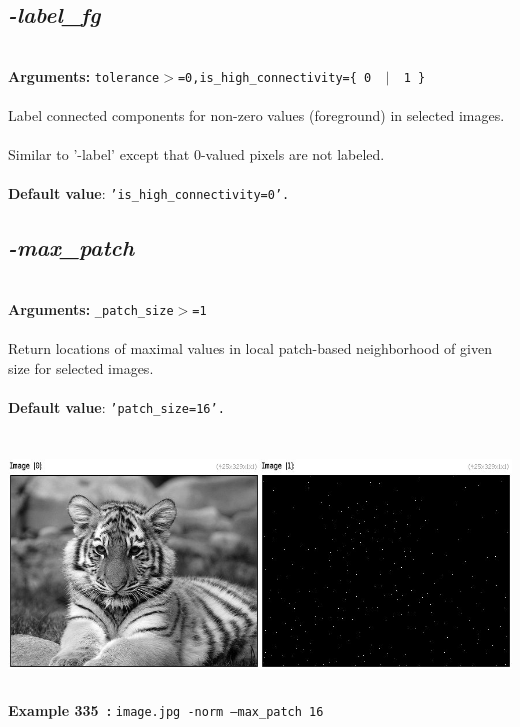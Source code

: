 \documentclass[a4paper,11pt,twoside]{book}
\begin{document}
\subsection{\emph{-label\_fg} }\vspace*{-0.5em}
~\\\textbf{Arguments: } 
{\small \texttt{tolerance$>$=0,is\_high\_connectivity=\{ 0 ~$|$~ 1 \}}}\\~\\
Label connected components for non-zero values (foreground) in selected images.
~\\Similar to '-label' except that 0-valued pixels are not labeled.
~\\~\\\textbf{Default value}: {\small \texttt{'is\_high\_connectivity=0'.}}


\subsection{\emph{-max\_patch} }\vspace*{-0.5em}
~\\\textbf{Arguments: } 
{\small \texttt{\_patch\_size$>$=1}}\\~\\
Return locations of maximal values in local patch-based neighborhood of given size for selected images.
~\\~\\\textbf{Default value}: {\small \texttt{'patch\_size=16'.}}
\begin{center}\includegraphics[keepaspectratio=true,height=7cm,width=\textwidth]{img/gmic_def335.jpg}\\
{\footnotesize \textbf{Example 335~:} \texttt{image.jpg -norm --max\_patch 16}}
\end{center}
\end{document}
